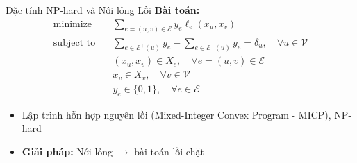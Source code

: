 \documentclass[aspectratio=169]{beamer}
\begin{document}
\begin{frame}{Đặc tính NP-hard và Nới lỏng Lồi}
    \textbf{Bài toán:}
    \begin{align}
        \text{minimize} \quad   & \sum_{e=(u,v) \in
        \mathcal{E}} y_e \ell_e(x_u, x_v) \label{eq:gcs_obj_milp}                                                                                                                \\
        \text{subject to} \quad & \sum_{e \in \mathcal{E}^+(u)} y_e - \sum_{e \in \mathcal{E}^-(u)} y_e = \delta_u, \quad \forall u \in \mathcal{V} \label{eq:flow_conservation} \\
                                & (x_u, x_v) \in X_e, \quad \forall e=(u,v) \in \mathcal{E} \label{eq:edge_constraint}                                                           \\
                                & x_v \in X_v, \quad \forall v \in \mathcal{V} \label{eq:vertex_constraint}                                                                      \\
                                & y_e \in \{0, 1\}, \quad \forall e \in \mathcal{E} \label{eq:binary_variable}
    \end{align}

    \begin{itemize}
        \item Lập trình hỗn hợp nguyên lồi (Mixed-Integer Convex Program - MICP),
              NP-hard~\cite{marcucci2023motion}
        \item \textbf{Giải pháp:} Nới lỏng $\rightarrow$ bài toán lồi chặt~\cite{marcucci2023motion,marcucci2024shortest}
    \end{itemize}

\end{frame}
\end{document}
